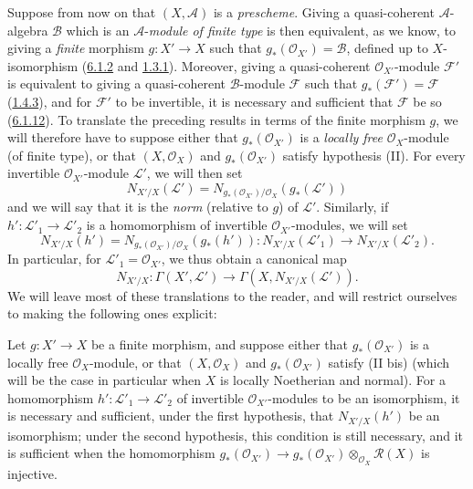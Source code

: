\begin{env}[6.5.5]
\label{II.6.5.5}
Suppose from now on that $(X,\mathcal{A})$ is a \emph{prescheme}. Giving a
quasi-coherent $\mathcal{A}$-algebra $\mathcal{B}$ which is an
$\mathcal{A}$-\emph{module of finite type} is then equivalent, as we know,
to giving a \emph{finite} morphism $g:X'\to X$ such that
$g_*(\mathcal{O}_{X'})=\mathcal{B}$, defined up to $X$-isomorphism
(\hyperref[II.6.1.2]{6.1.2} and \hyperref[II.1.3.1]{1.3.1}). Moreover,
giving a quasi-coherent $\mathcal{O}_{X'}$-module $\mathcal{F}'$ is
equivalent to giving a quasi-coherent $\mathcal{B}$-module $\mathcal{F}$ such
that $g_*(\mathcal{F}')=\mathcal{F}$ (\hyperref[II.1.4.3]{1.4.3}), and for
$\mathcal{F}'$ to be invertible, it is necessary and sufficient that
$\mathcal{F}$ be so (\hyperref[II.6.1.12]{6.1.12}). To translate the
preceding results in terms of the finite morphism $g$, we will therefore have
to suppose either that $g_*(\mathcal{O}_{X'})$ is a \emph{locally free}
$\mathcal{O}_X$-module (of finite type), or that $(X,\mathcal{O}_X)$ and
$g_*(\mathcal{O}_{X'})$ satisfy hypothesis (II). For every invertible
$\mathcal{O}_{X'}$-module $\mathcal{L}'$, we will then set
\[
\label{II.6.5.5.1}
N_{X'/X}(\mathcal{L}')
=N_{g_*(\mathcal{O}_{X'})/\mathcal{O}_X}(g_*(\mathcal{L}'))
\tag{6.5.5.1}
\]
and we will say that it is the \emph{norm} (relative to $g$) of
$\mathcal{L}'$. Similarly, if $h':\mathcal{L}'_1\to\mathcal{L}'_2$ is a
homomorphism of invertible $\mathcal{O}_{X'}$-modules, we will set
\[
\label{II.6.5.5.2}
N_{X'/X}(h')
=N_{g_*(\mathcal{O}_{X'})/\mathcal{O}_X}(g_*(h')):
N_{X'/X}(\mathcal{L}'_1)\to N_{X'/X}(\mathcal{L}'_2).
\tag{6.5.5.2}
\]
In particular, for $\mathcal{L}'_1=\mathcal{O}_{X'}$, we thus obtain a
canonical map
\[
\label{II.6.5.5.3}
N_{X'/X}:\Gamma(X',\mathcal{L}')
\to\Gamma(X,N_{X'/X}(\mathcal{L}')).
\tag{6.5.5.3}
\]
We will leave most of these translations to the reader, and will restrict
ourselves to making the following ones explicit:
\end{env}

\begin{proposition}[6.5.6]
\label{II.6.5.6}
Let $g:X'\to X$ be a finite morphism, and suppose either that
$g_*(\mathcal{O}_{X'})$ is a locally free $\mathcal{O}_X$-module, or that
$(X,\mathcal{O}_X)$ and $g_*(\mathcal{O}_{X'})$ satisfy \textup{(II bis)}
(which will be the case in particular when $X$ is locally Noetherian and
normal). For a homomorphism $h':\mathcal{L}'_1\to\mathcal{L}'_2$ of
invertible $\mathcal{O}_{X'}$-modules to be an isomorphism, it is necessary
and sufficient, under the first hypothesis, that $N_{X'/X}(h')$ be an
isomorphism; under the second hypothesis, this condition is still necessary,
and it is sufficient when the homomorphism
$g_*(\mathcal{O}_{X'})\to
g_*(\mathcal{O}_{X'})\otimes_{\mathcal{O}_X}\mathcal{R}(X)$ is injective.
\end{proposition}

